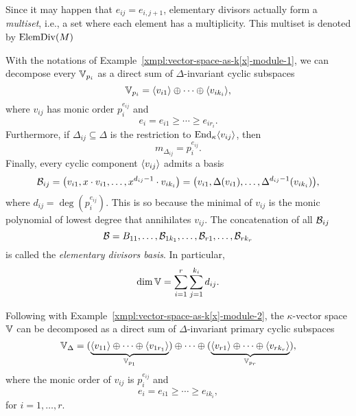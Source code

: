 \begin{ntn}
     Since it may happen that\/ $e_{ij}=e_{i,j+1}$, elementary divisors actually form a \textsl{multiset}, i.e., a set where each element has a multiplicity. This multiset is denoted by\/ $\operatorname{ElemDiv}(M)$
\end{ntn}

\begin{xmpl}\label{xmpl:vector-space-as-k[x]-module-2}
    With the notations of Example~\ref{xmpl:vector-space-as-k[x]-module-1}, we can decompose every $\mathbb V_{p_i}$ as a direct sum of $\Delta$-invariant cyclic subspaces
    $$
        \mathbb V_{p_i} = \langle v_{i1}\rangle\oplus\cdots\oplus\langle v_{ik_i}\rangle,
    $$
    where $v_{ij}$ has monic order $p_i^{e_{ij}}$ and
    $$
        e_i=e_{i1}\ge\cdots\ge e_{ir_i}.
    $$
    Furthermore, if $\Delta_{ij}\subseteq\Delta$ is the restriction to ${\operatorname{End}}_\kappa\langle v_{ij}\rangle$, then
    $$
        m_{\Delta_{ij}}=p_i^{e_{ij}}.
    $$
    Finally, every cyclic component $\langle v_{ij}\rangle$ admits a basis
    $$
        \mathcal B_{ij}=\big(v_{i1},x\cdot v_{i1},\dots,x^{d_{ij}-1}
            \cdot v_{ik_i}\big)
        =
        \big(v_{i1},\Delta(v_{i1}),\dots,\Delta^{d_{ij}-1}
            (v_{ik_i})\big),
    $$
    where $d_{ij}=\deg(p_i^{e_{ij}})$. This is so because the minimal of $v_{ij}$ is the monic polynomial of lowest degree that annihilates $v_{ij}$. The concatenation of all $\mathcal B_{ij}$
    $$
        \mathcal B = B_{11},\dots,\mathcal B_{1k_1},
            \dots,\mathcal B_{r1},\dots,\mathcal B_{rk_r}
    $$
    is called the \textsl{elementary divisors basis}. In particular,
    $$
        \dim\mathbb V = \sum_{i=1}^r\sum_{j=1}^{k_i}d_{ij}.
    $$
\end{xmpl}

\begin{xmpl}\label{xmpl:vector-space-as-k[x]-module-3}
    Following with Example~\ref{xmpl:vector-space-as-k[x]-module-2}, the $\kappa$-vector space $\mathbb V$ can be decomposed as a direct sum of $\Delta$-invariant primary cyclic subspaces
    $$
        \mathbb V_\Delta = (\underbrace{\langle v_{11}\rangle
            \oplus\cdots\oplus
            \langle v_{1r_1}\rangle}_{\mathbb V_{p_1}})
            \oplus\cdots\oplus
            (\underbrace{\langle v_{r1}\rangle
            \oplus\cdots\oplus
            \langle v_{rk_r}\rangle}_{\mathbb V_{p_r}}),
    $$
    where the monic order of $v_{ij}$ is $p_i^{e_{ij}}$ and
    $$
        e_i=e_{i1}\ge\cdots\ge e_{ik_i},
    $$
    for $i=1,\dots,r$.
\end{xmpl}
    


